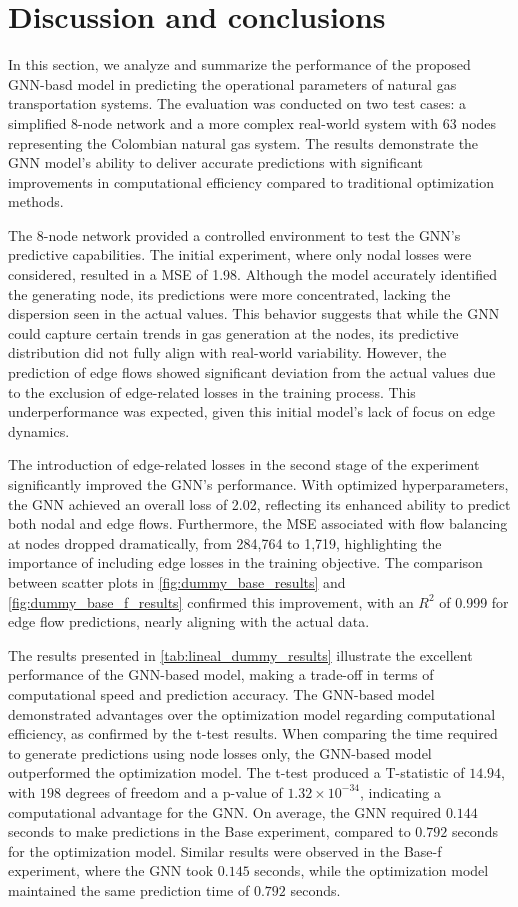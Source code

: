 \section{Discussion and conclusions}

In this section, we analyze and summarize the performance of the proposed GNN-basd model in predicting the operational parameters of natural gas transportation systems. The evaluation was conducted on two test cases: a simplified 8-node network and a more complex real-world system with 63 nodes representing the Colombian natural gas system. The results demonstrate the GNN model's ability to deliver accurate predictions with significant improvements in computational efficiency compared to traditional optimization methods.


The 8-node network provided a controlled environment to test the GNN's predictive capabilities. The initial experiment, where only nodal losses were considered, resulted in a MSE of 1.98. Although the model accurately identified the generating node, its predictions were more concentrated, lacking the dispersion seen in the actual values. This behavior suggests that while the GNN could capture certain trends in gas generation at the nodes, its predictive distribution did not fully align with real-world variability. However, the prediction of edge flows showed significant deviation from the actual values due to the exclusion of edge-related losses in the training process. This underperformance was expected, given this initial model's lack of focus on edge dynamics.


The introduction of edge-related losses in the second stage of the experiment significantly improved the GNN's performance. With optimized hyperparameters, the GNN achieved an overall loss of 2.02, reflecting its enhanced ability to predict both nodal and edge flows. Furthermore, the MSE associated with flow balancing at nodes dropped dramatically, from 284,764 to 1,719, highlighting the importance of including edge losses in the training objective. The comparison between scatter plots in \cref{fig:dummy_base_results} and \cref{fig:dummy_base_f_results} confirmed this improvement, with an $R^2$ of 0.999 for edge flow predictions, nearly aligning with the actual data.



 The results presented in \cref{tab:lineal_dummy_results} illustrate the excellent performance of the GNN-based model, making a trade-off in terms of computational speed and prediction accuracy. The GNN-based model demonstrated advantages over the optimization model regarding computational efficiency, as confirmed by the t-test results. When comparing the time required to generate predictions using node losses only, the GNN-based model outperformed the optimization model. The t-test produced a T-statistic of $14.94$, with $198$ degrees of freedom and a p-value of $1.32 \times 10^{-34}$, indicating a computational advantage for the GNN. On average, the GNN required $0.144$ seconds to make predictions in the Base experiment, compared to $0.792$ seconds for the optimization model. Similar results were observed in the Base-f experiment, where the GNN took $0.145$ seconds, while the optimization model maintained the same prediction time of $0.792$ seconds.

